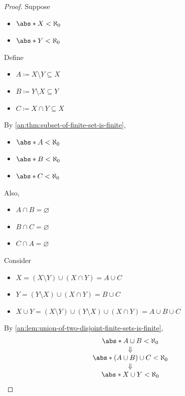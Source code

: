 \begin{proof}
  Suppose
  \begin{itemize}
    \item $\abs*{X} < \aleph_{0}$
    \item $\abs*{Y} < \aleph_{0}$
  \end{itemize}
  Define
  \begin{itemize}
    \item $A \coloneqq X \setminus Y \subseteq X$
    \item $B \coloneqq Y \setminus X \subseteq Y$
    \item $C \coloneqq X \cap Y \subseteq X$
  \end{itemize}
  By \cref{an:thm:subset-of-finite-set-is-finite},
  \begin{itemize}
    \item $\abs*{A} < \aleph_{0}$
    \item $\abs*{B} < \aleph_{0}$
    \item $\abs*{C} < \aleph_{0}$
  \end{itemize}
  Also,
  \begin{itemize}
    \item $A \cap B = \varnothing$
    \item $B \cap C = \varnothing$
    \item $C \cap A = \varnothing$
  \end{itemize}
  Consider
  \begin{itemize}
    \item $X = (X \setminus Y) \cup (X \cap Y) = A \cup C$
    \item $Y = (Y \setminus X) \cup (X \cap Y) = B \cup C$
    \item $X \cup Y = (X \setminus Y) \cup (Y \setminus X) \cup (X \cap Y) = A \cup B \cup C$
  \end{itemize}
  By \cref{an:lem:union-of-two-disjoint-finite-sets-is-finite},
  \[
    \begin{array}{c}
      \abs*{A \cup B} < \aleph_{0}          \\
      \Downarrow                            \\
      \abs*{(A \cup B) \cup C} < \aleph_{0} \\
      \Downarrow                            \\
      \abs*{X \cup Y} < \aleph_{0}
    \end{array}
  \]
\end{proof}

\bigskip

